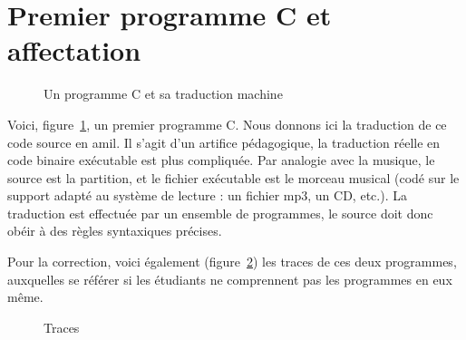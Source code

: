 
\newcommand{\commentaire}[1]{}


\vspace{-1cm}

\section{Premier programme C et affectation}


\begin{figure}[h]
  \centering
  \hfill
\caption{Un programme C et sa traduction machine}
\label{fig:programmes}
\end{figure}


Voici, figure~\ref{fig:programmes}, un premier programme C.
Nous donnons ici la traduction de ce code source en amil. Il s'agit d'un artifice pédagogique, la traduction réelle en code binaire exécutable est plus compliquée.  Par analogie avec la musique, le source est la partition, et le fichier exécutable est le morceau musical (codé sur le support adapté au système de lecture : un fichier mp3, un CD, etc.). La traduction est effectuée par un ensemble de programmes, le source doit donc obéir à des règles syntaxiques précises.

\begin{correction}
Pour la correction, voici également (figure~\ref{fig:traces}) les traces de ces deux programmes,
auxquelles se référer si les étudiants ne comprennent pas les
programmes en eux même.
\begin{figure}[htbp]
  \centering
  \caption{Traces}
\label{fig:traces}
\end{figure}
\end{correction}


